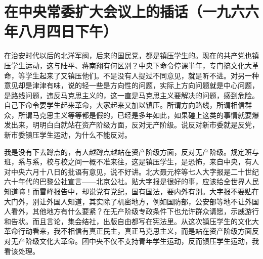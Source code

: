 \section[在中央常委扩大会议上的插话（一九六六年八月四日下午）]{在中央常委扩大会议上的插话（一九六六年八月四日下午）}


在治安时代以后的北洋军阀，后来的国民党，都是镇压学生的。现在的共产党也镇压学生运动，这与陆平、蒋南翔有何区别？中央下命令停课半年，专门搞文化大革命，等学生起来了又镇压他们。不是没有人提过不同意见，就是听不进。对另一种意见却是津津有味，说的轻一些是方向性的问题，实际上方向问题就是中心问题，是路线问题，违反马克思主义的，这一直是马克思主义要解决的问题，感到危险。自己下命令要学生起来革命，大家起来又加以镇压。所谓方向路线，所谓相信群众，所谓马克思主义等等都是假的，已经是多年如此，如果碰上这类的事情就要爆发出来，明明白白就站在资产阶级方面，反对无产阶级。说反对新市委就是反党，新市委镇压学生运动，为什么不能反对。

我是没有下去蹲点的，有人越蹲点越站在资产阶级方面，反对无产阶级。规定班与班，系与系，校与校之间一概不准来往，这是镇压学生，是恐怖，来自中央，有人对中央六月十八日的批语有意见，说不好讲。北大聂元梓等七人大字报是二十世纪六十年代的巴黎公社宣言——北京公社。贴大字报是很好的事，应该给全世界人民知道嘛！而雪峰报告中，却说党有党纪，国有国法，要内外有别。大字报不要贴在大门外，别让外国人知道，其实除了机密地方，例如国防部，公安部等地不让外国人看外，其他地方有什么要紧？在无产阶级专政条件下也允许群众请愿，示威游行和告状。而且言论，集会结社，出版自由都写在宪法里。从这次镇压学生的文化大革命行动看来，我不相信有真正民主，真正马克思主义，而是站在资产阶级方面反对无产阶级文化大革命。团中央不仅不支持青年学生运动，反而镇压学生运动，我看该处理。

